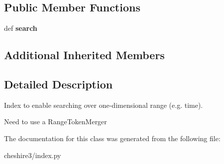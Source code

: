 \subsection*{Public Member Functions}
\begin{DoxyCompactItemize}
\item 
\hypertarget{classcheshire3_1_1index_1_1_range_index_a9fd09acbdf5b3f20711f215a09b8ae30}{def {\bfseries search}}\label{classcheshire3_1_1index_1_1_range_index_a9fd09acbdf5b3f20711f215a09b8ae30}

\end{DoxyCompactItemize}
\subsection*{Additional Inherited Members}


\subsection{Detailed Description}
\begin{DoxyVerb}Index to enable searching over one-dimensional range (e.g. time).

Need to use a RangeTokenMerger
\end{DoxyVerb}
 

The documentation for this class was generated from the following file\-:\begin{DoxyCompactItemize}
\item 
cheshire3/index.\-py\end{DoxyCompactItemize}

